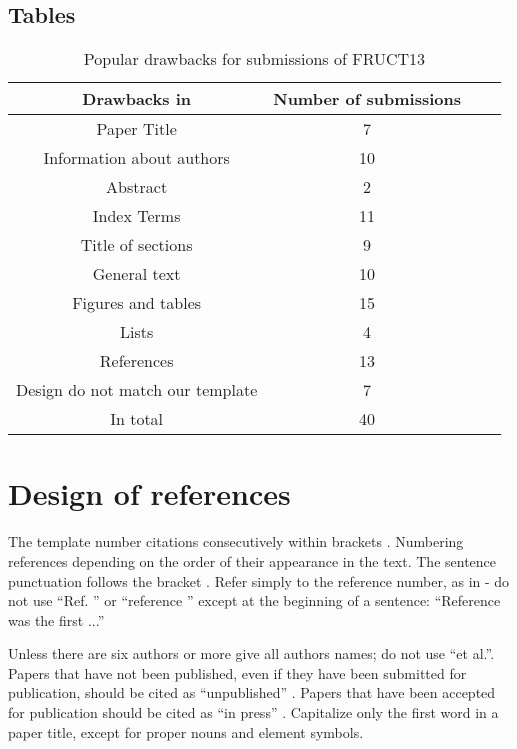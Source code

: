 \subsection{Tables}

\begin{table}[h]
	\centering
	\label{tab1}
	\caption{Popular drawbacks for submissions of FRUCT13}\label{tab1}\vspace{4pt}
	\begin{tabular}{|c|c|c|c|}
		
		\hline
		\textbf{Drawbacks in} & \textbf{Number of submissions} \\
		\hline
		Paper Title & 7 \\
		\hline
		Information about authors & 10 \\
		\hline
		Abstract & 2 \\
		\hline
		Index Terms & 11 \\
		\hline
		Title of sections & 9 \\
		\hline
		General text & 10 \\
		\hline
		Figures and tables & 15 \\
		\hline
		Lists & 4 \\
		\hline
		References & 13 \\
		\hline
		Design do not match our template & 7 \\
		\hline
		In total & 40 \\
		\hline
	\end{tabular}
\end{table}

\section{Design of references}

The template number citations consecutively within brackets \cite{Cover}. Numbering references depending on the order of their appearance in the text. The sentence punctuation follows the bracket \cite{Dobrushin}. Refer simply to the reference number, as in \cite{Blachman} - do not use ``Ref. \cite{Blachman}'' or ``reference \cite{Blachman}'' except at the beginning of a sentence: ``Reference \cite{Blachman} was the first ...''

Unless there are six authors or more give all authors names; do not use ``et al.''. Papers that have not been published, even if they have been submitted for publication, should be cited as ``unpublished'' \cite{Elissa}. Papers that have been accepted for publication should be cited as ``in press'' \cite{Nicole}. Capitalize only the first word in a paper title, except for proper nouns and element symbols.

